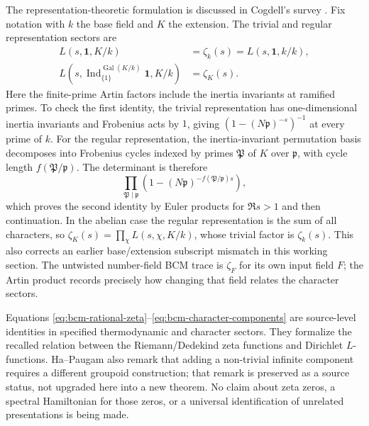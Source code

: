 The representation-theoretic formulation is discussed in Cogdell's survey
\cite[pp.~7--8]{cogdellArtinL}. Fix notation with $k$ the base field and
$K$ the extension. The trivial and regular representation sectors are
\begin{equation}
 \begin{aligned}
 L(s,\mathbf1, K/k)&=\zeta_k(s)=L(s,\mathbf1,k/k),\\
 L(s,\operatorname{Ind}_{\{1\}}^{\operatorname{Gal}(K/k)}\mathbf1,K/k)
   &=\zeta_K(s).
 \end{aligned}
 \label{eq:artin-trivial-character-factor}
\end{equation}
Here the finite-prime Artin factors include the inertia invariants at
ramified primes. To check the first identity, the trivial representation
has one-dimensional inertia invariants and Frobenius acts by $1$, giving
$(1-(N\mathfrak p)^{-s})^{-1}$ at every prime of $k$.
For the regular representation, the inertia-invariant permutation basis
decomposes into Frobenius cycles indexed by primes $\mathfrak P$ of $K$
over $\mathfrak p$, with cycle length $f(\mathfrak P/\mathfrak p)$.
The determinant is therefore
\[
 \prod_{\mathfrak P\mid\mathfrak p}
  (1-(N\mathfrak p)^{-f(\mathfrak P/\mathfrak p)s}),
\]
which proves the second identity by Euler products for $\Re s>1$ and then
continuation. In the abelian case the regular representation is the sum
of all characters, so $\zeta_K(s)=\prod_\chi L(s,\chi,K/k)$, whose
trivial factor is $\zeta_k(s)$. This also corrects an earlier base/extension
subscript mismatch in this working section. The untwisted number-field
BCM trace is $\zeta_F$ for its own input field $F$; the Artin product
records precisely how changing that field relates the character sectors.

\begin{remark}
Equations \eqref{eq:bcm-rational-zeta}--\eqref{eq:bcm-character-components}
are source-level identities in specified thermodynamic and character sectors.
They formalize the recalled relation between the Riemann/Dedekind zeta
functions and Dirichlet $L$-functions.  Ha--Paugam also remark that adding a
non-trivial infinite component requires a different groupoid construction;
that remark is preserved as a source status, not upgraded here into a new
theorem.  No claim about zeta zeros, a spectral Hamiltonian for those zeros,
or a universal identification of unrelated presentations is being made.
\end{remark}
